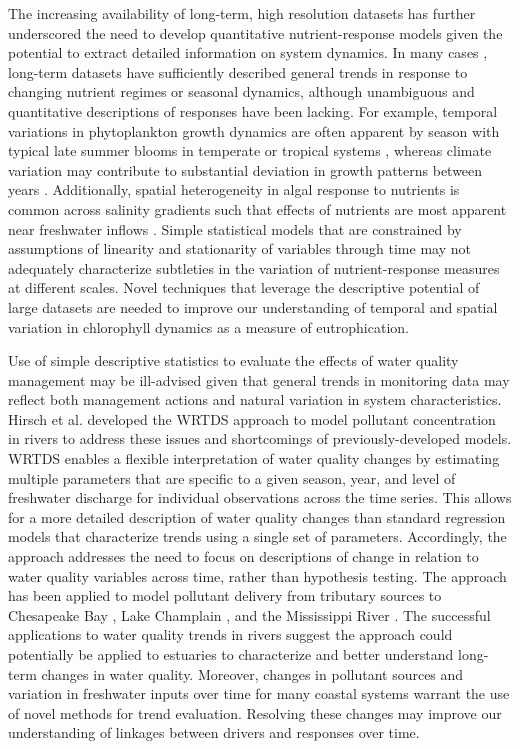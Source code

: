 \documentclass{svjour3}\usepackage[]{graphicx}\usepackage[]{color}
\begin{document}
The increasing availability of long-term, high resolution datasets has further underscored the need to develop quantitative nutrient-response models given the potential to extract detailed information on system dynamics.  In many cases \cite{Caffrey03,Greening06}, long-term datasets have sufficiently described general trends in response to changing nutrient regimes or seasonal dynamics, although unambiguous and quantitative descriptions of responses have been lacking.  For example, temporal variations in phytoplankton growth dynamics are often apparent by season with typical late summer blooms in temperate or tropical systems \cite{Cloern96}, whereas climate variation may contribute to substantial deviation in growth patterns between years \cite{Jassby02}.  Additionally, spatial heterogeneity in algal response to nutrients is common across salinity gradients such that effects of nutrients are most apparent near freshwater inflows \cite{Cloern96}.  Simple statistical models that are constrained by assumptions of linearity and stationarity  of variables through time may not adequately characterize subtleties in the variation of nutrient-response measures at different scales.  Novel techniques that leverage the descriptive potential of large datasets are needed to improve our understanding of temporal and spatial variation in chlorophyll dynamics as a measure of eutrophication.

Use of simple descriptive statistics to evaluate the effects of water quality management may be ill-advised given that general trends in monitoring data may reflect both management actions and natural variation in system characteristics.  Hirsch et al. \cite{Hirsch10} developed the \ac{WRTDS} approach to model pollutant concentration in rivers to address these issues and shortcomings of previously-developed models.  \ac{WRTDS} enables a flexible interpretation of water quality changes by estimating multiple parameters that are specific to a given season, year, and level of freshwater discharge for individual observations across the time series.  This allows for a more detailed description of water quality changes than standard regression models that characterize trends using a single set of parameters.  Accordingly, the approach addresses the need to focus on descriptions of change in relation to water quality variables across time, rather than hypothesis testing. The approach has been applied to model pollutant delivery from tributary sources to Chesapeake Bay \cite{Hirsch10,Moyer12,Zhang13}, Lake Champlain \cite{Medalie12}, and the Mississippi River \cite{Sprague11}.  The successful applications to water quality trends in rivers suggest the approach could potentially be applied to estuaries to characterize and better understand long-term changes in water quality.  Moreover, changes in pollutant sources and variation in freshwater inputs over time for many coastal systems warrant the use of novel methods for trend evaluation.  Resolving these changes may improve our understanding of linkages between drivers and responses over time. 
\end{document}
